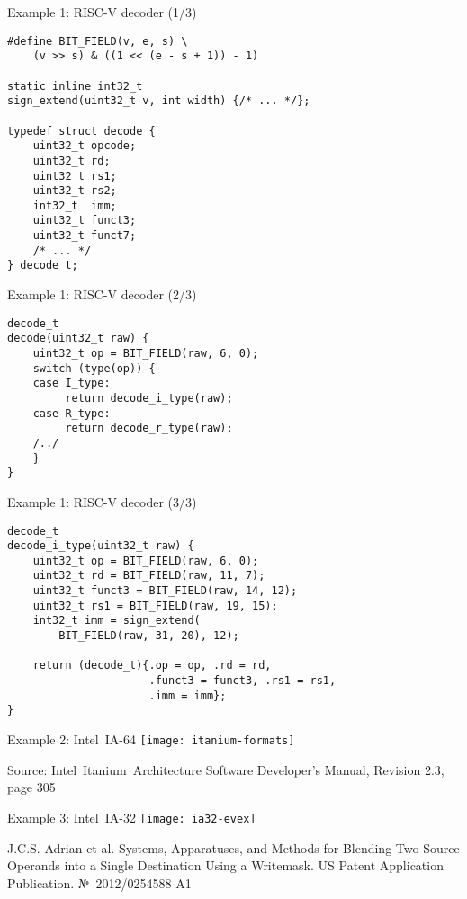 \begin{frame}[fragile]{Example 1: RISC-V decoder (1/3)}
\begin{lstlisting}
#define BIT_FIELD(v, e, s) \
    (v >> s) & ((1 << (e - s + 1)) - 1)

static inline int32_t
sign_extend(uint32_t v, int width) {/* ... */};

typedef struct decode {
    uint32_t opcode;
    uint32_t rd;
    uint32_t rs1;
    uint32_t rs2;
    int32_t  imm;
    uint32_t funct3;
    uint32_t funct7;
    /* ... */
} decode_t;
\end{lstlisting}
\end{frame}

\begin{frame}[fragile]{Example 1: RISC-V decoder (2/3)}
\begin{lstlisting}
decode_t
decode(uint32_t raw) {
    uint32_t op = BIT_FIELD(raw, 6, 0);
    switch (type(op)) {
    case I_type:
         return decode_i_type(raw);
    case R_type:
         return decode_r_type(raw);
    /../
    }
}
\end{lstlisting}
\end{frame}

\begin{frame}[fragile]{Example 1: RISC-V decoder (3/3)}
\begin{lstlisting}
decode_t
decode_i_type(uint32_t raw) {
    uint32_t op = BIT_FIELD(raw, 6, 0);
    uint32_t rd = BIT_FIELD(raw, 11, 7);
    uint32_t funct3 = BIT_FIELD(raw, 14, 12);
    uint32_t rs1 = BIT_FIELD(raw, 19, 15);
    int32_t imm = sign_extend(
        BIT_FIELD(raw, 31, 20), 12);

    return (decode_t){.op = op, .rd = rd,
                      .funct3 = funct3, .rs1 = rs1,
                      .imm = imm};
}
\end{lstlisting}
\end{frame}

\begin{frame}{Example 2: Intel\reg~IA-64}
\centering
\texttt{[image: itanium-formats]}

\tiny{Source: Intel\reg~Itanium\reg~Architecture Software
      Developer’s Manual, Revision 2.3, page 305}
\end{frame}

\begin{frame}{Example 3: Intel\reg~IA-32}
\centering
\texttt{[image: ia32-evex]}

\tiny{J.C.S. Adrian et al. Systems, Apparatuses, and Methods for Blending Two
      Source Operands into a Single Destination Using a Writemask. US Patent
      Application Publication. №~2012/0254588 A1}
\end{frame}


